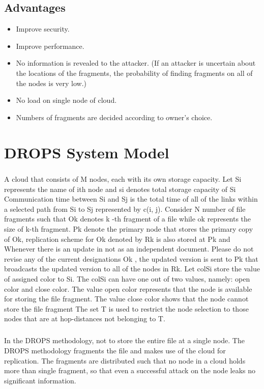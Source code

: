 \section{Advantages}
\begin{itemize}
	\item  Improve security.
	\item  Improve performance. 
	\item  No information is revealed to the attacker. (If an attacker is uncertain about the locations of the fragments, the probability of finding fragments on all of the nodes is very low.)
	\item  No load on single node of cloud.
	\item  Numbers of fragments are decided according to owner’s choice.
\end{itemize}
\chapter{ DROPS System Model}
\paragraph{}
A cloud that consists of M nodes, each with its own storage capacity. Let Si represents
the name of ith node and si denotes total storage capacity of Si Communication time
between Si and Sj is the total time of all of the links within a selected path from Si to Sj
represented by c(i, j). Consider N number of file fragments such that Ok denotes k -th
fragment of a file while ok represents the size of k-th fragment. Pk denote the primary
node that stores the primary copy of Ok, replication scheme for Ok denoted by Rk is also
stored at Pk and Whenever there is an update in not as an independent document. Please
do not revise any of the current designations Ok , the updated version is sent to Pk that
broadcasts the updated version to all of the nodes in Rk. Let colSi store the value of
assigned color to Si. The colSi can have one out of two values, namely: open color and
close color. The value open color represents that the node is available for storing the file
fragment. The value close color shows that the node cannot store the file fragment The
set T is used to restrict the node selection to those nodes that are at hop-distances not
belonging to T.
\paragraph*{}
In the DROPS methodology, not to store the entire file at a single node. The DROPS
methodology fragments the file and makes use of the cloud for replication. The fragments
are distributed such that no node in a cloud holds more than single fragment, so that even
a successful attack on the node leaks no significant information.

